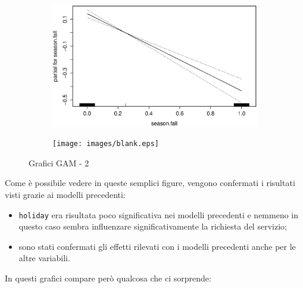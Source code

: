 \begin{figure}[H]
        \medskip
        \begin{subfigure}{0.4\textwidth}
          \includegraphics[width=\columnwidth]{images/non-linear/gam/gam-fall.eps}
        \end{subfigure}
        \hspace*{\fill}
        \begin{subfigure}{0.4\textwidth}
          \texttt{[image: images/blank.eps]}
        \end{subfigure}

        \caption{Grafici GAM - 2}\label{fig:gam-2}
\end{figure}

Come è possibile vedere in queste semplici figure, vengono confermati i
risultati visti grazie ai modelli precedenti:

\begin{itemize}
\item \texttt{holiday} era risultata poco significativa nei modelli precedenti
  e nemmeno in questo caso sembra influenzare significativamente la richiesta del servizio;
\item sono stati confermati gli effetti rilevati con i modelli precedenti
  anche per le altre variabili.
\end{itemize}

In questi grafici compare però qualcosa che ci sorprende:

